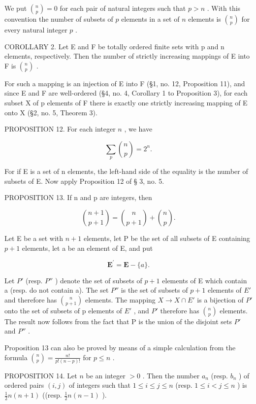We put \(\binom{n}{p} = 0\) for each pair of natural integers such that \(p > n\) . With this convention the number of subsets of \(p\) elements in a set of \(n\) elements is \(\binom{n}{p}\) for every natural integer \(p\) .

COROLLARY 2. Let E and F be totally ordered finite sets with p and n elements, respectively. Then the number of strictly increasing mappings of E into F is \(\binom{n}{p}\) .

For such a mapping is an injection of E into F (§1, no. 12, Proposition 11), and since E and F are well-ordered (§4, no. 4, Corollary 1 to Proposition 3), for each subset X of p elements of F there is exactly one strictly increasing mapping of E onto X (§2, no. 5, Theorem 3).

PROPOSITION 12. For each integer \(n\) , we have

\[
\sum_ {p} \binom{n}{p} = 2 ^ {n}.
\]

For if E is a set of n elements, the left-hand side of the equality is the number of subsets of E. Now apply Proposition 12 of § 3, no. 5.

PROPOSITION 13. If n and p are integers, then

\[
\binom {n + 1} {p + 1} = \binom {n} {p + 1} + \binom {n} {p}.
\]

Let E be a set with \(n + 1\) elements, let P be the set of all subsets of E containing \(p + 1\) elements, let a be an element of E, and put

\[
\mathbf {E} ^ {\prime} = \mathbf {E} - \{a \}.
\]

Let \(P'\) (resp. \(P''\) ) denote the set of subsets of \(p + 1\) elements of E which contain a (resp. do not contain a). The set \(P''\) is the set of subsets of \(p + 1\) elements of \(E'\) and therefore has \(\binom{n}{p+1}\) elements. The mapping \(X \to X \cap E'\) is a bijection of \(P'\) onto the set of subsets of p elements of \(E'\) , and \(P'\) therefore has \(\binom{n}{p}\) elements. The result now follows from the fact that P is the union of the disjoint sets \(P'\) and \(P''\) .

Proposition 13 can also be proved by means of a simple calculation from the formula \(\binom{n}{p} = \frac{n!}{p!(n - p)!}\) for \(p \leqslant n\) .

PROPOSITION 14. Let \(n\) be an integer \(> 0\) . Then the number \(a_{n}\) (resp. \(b_{n}\) ) of ordered pairs \((i, j)\) of integers such that \(1 \leqslant i \leqslant j \leqslant n\) (resp. \(1 \leqslant i < j \leqslant n\) ) is \(\frac{1}{2} n(n + 1)\) ((resp. \(\frac{1}{2} n(n - 1)\) ).

